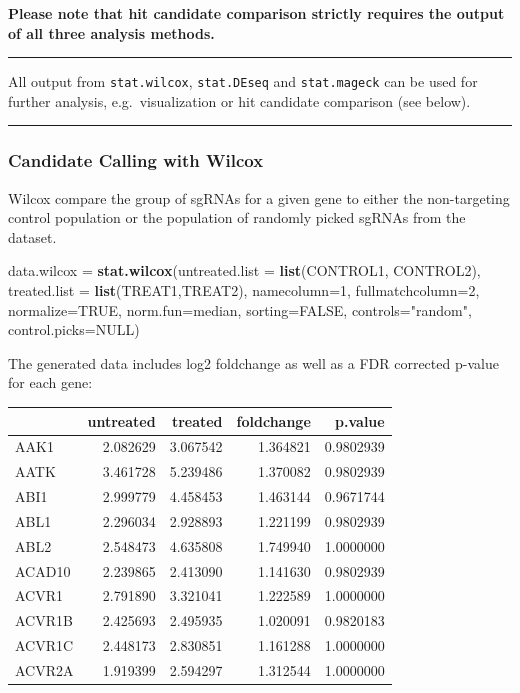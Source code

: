 \documentclass[]{article}
\newenvironment{Shaded}{\begin{snugshade}}{\end{snugshade}}
\newcommand{\KeywordTok}[1]{\textcolor[rgb]{0.13,0.29,0.53}{\textbf{{#1}}}}
\newcommand{\DataTypeTok}[1]{\textcolor[rgb]{0.13,0.29,0.53}{{#1}}}
\newcommand{\DecValTok}[1]{\textcolor[rgb]{0.00,0.00,0.81}{{#1}}}
\newcommand{\StringTok}[1]{\textcolor[rgb]{0.31,0.60,0.02}{{#1}}}
\newcommand{\OtherTok}[1]{\textcolor[rgb]{0.56,0.35,0.01}{{#1}}}
\newcommand{\NormalTok}[1]{{#1}}
\begin{document}
\textbf{Please note that hit candidate comparison strictly requires the
output of all three analysis methods.}

\begin{center}\rule{0.5\linewidth}{\linethickness}\end{center}

All output from \texttt{stat.wilcox}, \texttt{stat.DEseq} and
\texttt{stat.mageck} can be used for further analysis,
e.g.~visualization or hit candidate comparison (see below).

\begin{center}\rule{0.5\linewidth}{\linethickness}\end{center}

\newpage

\subsubsection{Candidate Calling with
Wilcox}\label{candidate-calling-with-wilcox}

Wilcox compare the group of sgRNAs for a given gene to either the
non-targeting control population or the population of randomly picked
sgRNAs from the dataset.

\begin{Shaded}
\begin{Highlighting}[]
\NormalTok{data.wilcox =}\StringTok{ }\KeywordTok{stat.wilcox}\NormalTok{(}\DataTypeTok{untreated.list =} \KeywordTok{list}\NormalTok{(CONTROL1, CONTROL2),}
  \DataTypeTok{treated.list =} \KeywordTok{list}\NormalTok{(TREAT1,TREAT2), }\DataTypeTok{namecolumn=}\DecValTok{1}\NormalTok{, }\DataTypeTok{fullmatchcolumn=}\DecValTok{2}\NormalTok{,}
  \DataTypeTok{normalize=}\OtherTok{TRUE}\NormalTok{, }\DataTypeTok{norm.fun=}\NormalTok{median, }\DataTypeTok{sorting=}\OtherTok{FALSE}\NormalTok{, }\DataTypeTok{controls=}\StringTok{"random"}\NormalTok{,}
  \DataTypeTok{control.picks=}\OtherTok{NULL}\NormalTok{)}
\end{Highlighting}
\end{Shaded}

The generated data includes log2 foldchange as well as a FDR corrected
p-value for each gene:

\begin{longtable}[c]{@{}lrrrr@{}}
\toprule
& untreated & treated & foldchange & p.value\tabularnewline
\midrule
\endhead
AAK1 & 2.082629 & 3.067542 & 1.364821 & 0.9802939\tabularnewline
AATK & 3.461728 & 5.239486 & 1.370082 & 0.9802939\tabularnewline
ABI1 & 2.999779 & 4.458453 & 1.463144 & 0.9671744\tabularnewline
ABL1 & 2.296034 & 2.928893 & 1.221199 & 0.9802939\tabularnewline
ABL2 & 2.548473 & 4.635808 & 1.749940 & 1.0000000\tabularnewline
ACAD10 & 2.239865 & 2.413090 & 1.141630 & 0.9802939\tabularnewline
ACVR1 & 2.791890 & 3.321041 & 1.222589 & 1.0000000\tabularnewline
ACVR1B & 2.425693 & 2.495935 & 1.020091 & 0.9820183\tabularnewline
ACVR1C & 2.448173 & 2.830851 & 1.161288 & 1.0000000\tabularnewline
ACVR2A & 1.919399 & 2.594297 & 1.312544 & 1.0000000\tabularnewline
\bottomrule
\end{longtable}
\end{document}
